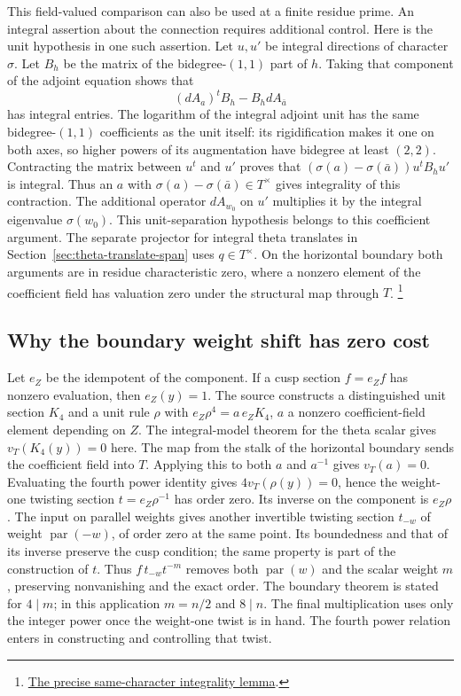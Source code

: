 This field-valued comparison can also be used at a finite residue
prime. An integral assertion about the connection requires additional
control. Here is the unit hypothesis in one such assertion. Let
\(u,u'\) be integral directions of character \(\sigma\). Let \(B_h\)
be the matrix of the bidegree-\((1,1)\) part of \(h\). Taking that
component of the adjoint equation shows that
\[
       (dA_a)^t B_h-B_h dA_{\bar a}
\]
has integral entries. The logarithm of the integral adjoint unit
has the same bidegree-\((1,1)\) coefficients as the unit itself:
its rigidification makes it one on both axes, so higher powers of
its augmentation have bidegree at least \((2,2)\). Contracting the
matrix between \(u^t\) and \(u'\) proves that
\((\sigma(a)-\sigma(\bar a))u^tB_hu'\) is integral.
Thus an \(a\) with \(\sigma(a)-\sigma(\bar a)\in T^\times\) gives
integrality of this contraction. The additional operator \(dA_{w_0}\)
on \(u'\) multiplies it by the integral eigenvalue \(\sigma(w_0)\).
This unit-separation hypothesis belongs to this coefficient argument.
The separate projector for integral theta translates in
Section~\ref{sec:theta-translate-span} uses \(q\in T^\times\).
On the horizontal boundary both arguments are in residue
characteristic zero, where a nonzero element of the coefficient
field has valuation zero under the structural map through \(T\).
\footnote{\href{https://github.com/ChristianKudeba/alpoge-rh-verification/blob/alpoge-source-7cbf7a0c/src/Development/AbelianVarietyTheory/Proofs/JetHarmonics/CanonicalGaugeEigenvectorPairingIntegral.lean}{The precise same-character integrality lemma}.}

\subsection{Why the boundary weight shift has zero cost}

Let \(e_Z\) be the idempotent of the component. If a cusp section
\(f=e_Z f\) has nonzero evaluation, then \(e_Z(y)=1\).
The source constructs a distinguished unit section \(K_4\) and a
unit rule \(\rho\) with \(e_Z\rho^4=a\,e_ZK_4\),
\(a\) a nonzero coefficient-field element depending on \(Z\).
The integral-model theorem for the theta scalar gives
\(v_T(K_4(y))=0\) here. The map from the stalk of the horizontal
boundary sends the coefficient field into \(T\). Applying this to
both \(a\) and \(a^{-1}\) gives \(v_T(a)=0\). Evaluating the fourth
power identity gives \(4v_T(\rho(y))=0\), hence the weight-one
twisting section \(t=e_Z\rho^{-1}\) has order zero. Its inverse on
the component is \(e_Z\rho\). The input on parallel weights gives
another invertible twisting section \(t_{-w}\) of weight
\(\operatorname{par}(-w)\), of order zero at the same point.
Its boundedness and that of its inverse preserve the cusp condition;
the same property is part of the construction of \(t\).
Thus \(f\,t_{-w}t^{-m}\) removes both \(\operatorname{par}(w)\) and
the scalar weight \(m\), preserving nonvanishing and the exact order.
The boundary theorem is stated for \(4\mid m\); in this application
\(m=n/2\) and \(8\mid n\). The final multiplication uses only the
integer power once the weight-one twist is in hand. The fourth
power relation enters in constructing and controlling that twist.

